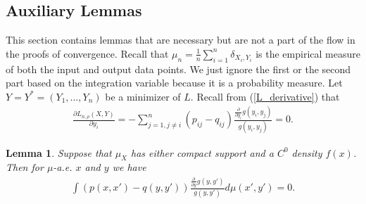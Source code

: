 \documentclass[10pt]{article}
\newtheorem{lemma}{\bf Lemma}
\newenvironment{Proof of lemma}{\noindent{\bf Proof of Lemma}}{\hfill$\Box$\newline}
\newenvironment{Proof of claim}{\noindent{\bf Proof of claim}}{\hfill$\Box$\newline}
\newenvironment{Proof of theorem}{\noindent{\bf Proof of Theorem}}{\hfill\scriptsize{$\Box$}\newline}
\newenvironment{Proof of theorems}{\noindent{\bf Proof of Theorems}}{\hfill$\Box$\newline}
\newenvironment{Proof of proposition}{\noindent{\bf Proof of Proposition}}{\hfill$\Box$\newline}
\newenvironment{Proof of propositions}{\noindent{\bf Proof of Propositions}}{\hfill$\Box$\newline}
\newenvironment{Proof of exercise}{\noindent{\it Proof of Exercise:}}{\hfill$\Box$}
\numberwithin{equation}{section}
\begin{document}
\subsection{Auxiliary Lemmas}\label{tsne:sec:extra_proofs}
This section contains lemmas that are necessary but are not a part of the flow
in the proofs of convergence. Recall that $\mu_n = \frac{1}{n}\sum_{i=1}^n
    \delta_{X_i,Y_i}$ is the empirical measure of both the input and output data
points. We just ignore the first or the second part based on the integration
variable because it is a probability measure. Let $Y = Y^* = (Y_1,\dots,Y_n)$
be a minimizer of $L$. Recall from (\ref{L_derivative}) that
\begin{align}
    \frac{\partial L_{n, \rho}(X,Y)}{\partial y_i} = -\sum_{j=1, j \neq i}^n (p_{ij}-q_{ij}) \frac{\frac{\partial}{\partial y_i}g(y_i,y_j)}{g(y_i,y_j)} = 0.
\end{align}
\begin{lemma} \label{appendix_lemma}
    Suppose that $\mu_X$ has either compact support and a $C^0$ density $f(x)$. Then for $\mu$-a.e. $x$ and $y$ we have
    \begin{align}
        \int (p(x,x')-q(y,y')) \frac{\frac{\partial}{\partial y}g(y,y')}{g(y,y')} d\mu(x',y') = 0.
    \end{align}
\end{lemma}
\end{document}
